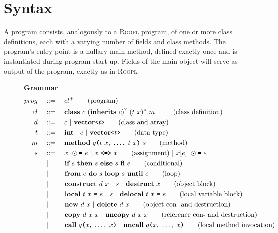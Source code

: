 \section{Syntax}
\label{sec:syntax}
A \rooplpp program consists, analogously to a \textsc{Roopl} program, of one or more class definitions, each with a varying number of fields and class methods. The program's entry point is a nullary main method, defined exactly once and is instantiated during program start-up. Fields of the main object will serve as output of the program, exactly as in \textsc{Roopl}.
\begin{figure}[h]
    \centering
    \vspace{3mm}
    \textbf{\rooplpp Grammar}
    \begin{align}
    prog		\quad&::= \quad cl^+ \tag{program}\\
    cl			\quad&::=\quad \textbf{class}\ c\ (\textbf{inherits}\ c)^?\ (t\ x)^*\ m^+\tag{class definition}\\
    d           \quad&::=\quad c\ |\ \textbf{vector}\texttt{<}t\texttt{>} \tag{class and array}\\
    t			\quad&::=\quad \textbf{int}\ |\ c\ |\ \textbf{vector}\texttt{<}t\texttt{>} \tag{data type}\\
    m			\quad&::=\quad \textbf{method}\ q\textbf{\texttt{(}}t\ x,\ \dots,\ t\ x\textbf{\texttt{)}}\ s\tag{method}\\
    s			\quad&::=\quad x\ \odot\textbf{\texttt{=}}\ e\ |\ x\ \textbf{\texttt{<=>}}\ x\tag{assignment}\ |\ x[e]\ \odot\textbf{\texttt{=}}\ e\\\
    			&\ |\ \qquad \textbf{if}\ e\ \textbf{then}\ s\ \textbf{else}\ s\ \textbf{fi}\ e\tag{conditional}\\
    			&\ |\ \qquad \textbf{from}\ e\ \textbf{do}\ s\ \textbf{loop}\ s\ \textbf{until}\ e\tag{loop}\\
                &\ |\ \qquad \textbf{construct}\ d\ x\quad s\quad\textbf{destruct}\ x\tag{object block}\\
                &\ |\ \qquad \textbf{local}\ t\ x\ \texttt{=}\ e\quad s\quad\textbf{delocal}\ t\ x\ \texttt{=}\ e\tag{local variable block}\\
                &\ |\ \qquad \textbf{new}\ d\ x\ |\ \textbf{delete}\ d\ x \tag{object con- and destruction}\\
                &\ |\ \qquad \textbf{copy}\ d\ x\ x\ |\ \textbf{uncopy}\ d\ x\ x \tag{reference con- and destruction}\\
    			&\ |\ \qquad \textbf{call}\ q\textbf{\texttt{(}}x,\ \dots,\ x\textbf{\texttt{)}}\ |\ \textbf{uncall}\ q\textbf{\texttt{(}}x,\ \dots,\ x\textbf{\texttt{)}}\tag{local method invocation}\\

\end{align}
\end{figure}

